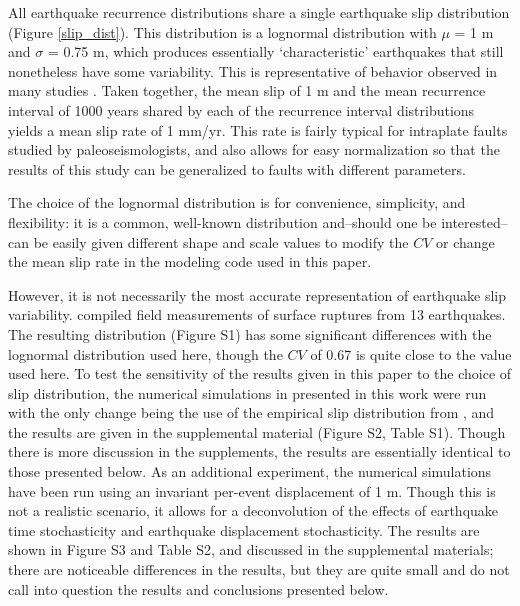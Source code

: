 \documentclass[se, manuscript]{copernicus}
\begin{document}
All earthquake recurrence distributions share a single earthquake slip
distribution (Figure \ref{slip_dist}). This distribution is a lognormal
distribution with \(\mu\) = 1 m and \(\sigma\) = 0.75 m, which produces
essentially `characteristic' earthquakes that still nonetheless have
some variability. This is representative of behavior observed in many
studies \citep[e.g.,][]{zielke_slip_2010, klinger_characteristic_2011,
zielke_earthquake_2018}. Taken together, the mean slip of 1 m and the
mean recurrence interval of 1000 years shared by each of the recurrence
interval distributions yields a mean slip rate of 1 mm/yr. This rate is
fairly typical for intraplate faults studied by paleoseismologists, and
also allows for easy normalization so that the results of this study can
be generalized to faults with different parameters.

The choice of the lognormal distribution is for convenience, simplicity, and
flexibility: it is a common, well-known distribution and--should one be
interested--can be easily given different shape and scale values to modify the
\(CV\) or change the mean slip rate in the modeling code used in this paper.

However, it is not necessarily the most accurate representation of earthquake
slip variability. \citet{biasi_estimating_2006} compiled field measurements of
surface ruptures from 13 earthquakes. The resulting distribution (Figure S1) has
some significant differences with the lognormal distribution used here, though
the \(CV\) of 0.67 is quite close to the value used here. To test the
sensitivity of the results given in this paper to the choice of slip
distribution, the numerical simulations in presented in this work were run with
the only change being the use of the empirical slip distribution from 
\citet{biasi_estimating_2006}, and the results are given in the supplemental 
material (Figure S2, Table S1). Though there is more discussion in the 
supplements, the results are essentially identical to those presented below. As 
an additional experiment, the numerical simulations have been run using an 
invariant per-event displacement of 1 m. Though this is not a realistic 
scenario, it allows for a deconvolution of the effects of earthquake time 
stochasticity and earthquake displacement stochasticity. The results are shown 
in Figure S3 and Table S2, and discussed in the supplemental materials; there 
are noticeable differences in the results, but they are quite small and do not 
call into question the results and conclusions presented below.
\end{document}

